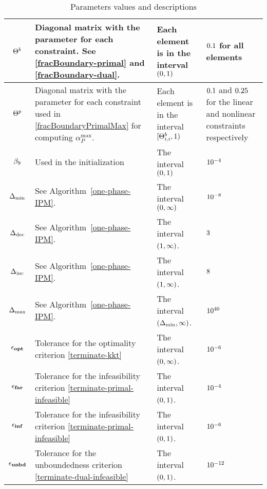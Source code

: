 \documentclass{article}
\begin{document}
\begin{table}[H]
\begin{tabular}{ |c| p{7cm}|p{4.0cm}| p{3cm}| }
\hline
 $\Theta^{b}$ & Diagonal matrix with the \fracBound{} parameter for each constraint. See \eqref{fracBoundary-primal} and \eqref{fracBoundary-dual}. & Each element is in the interval $(0,1)$ & $0.1$ for all elements \\ 
        \hline
$\Theta^{p}$ & Diagonal matrix with the \fracBound{} parameter for each constraint used in \eqref{fracBoundaryPrimalMax} for computing $\alpha_{P}^{\max}$. & Each element is in the interval $[\Theta^{b}_{i,i}, 1)$ & $0.1$ and $0.25$ for the linear and nonlinear constraints respectively \\
\hline
$\beta_{9}$  & Used in the initialization & The interval $(0,1)$ & $10^{-4}$ \\
\hline
$\Delta_{\min}$ & See Algorithm~\ref{one-phase-IPM}.  & The interval $(0,\infty)$ & $10^{-8}$ \\
\hline
$\Delta_{\text{dec}}$ & See Algorithm~\ref{one-phase-IPM}. &The interval $(1,\infty)$. & $3$ \\
\hline
$\Delta_{\text{inc}}$ & See Algorithm~\ref{one-phase-IPM}. &The interval $(1,\infty)$. & $8$ \\
\hline
$\Delta_{\max}$ & See Algorithm~\ref{one-phase-IPM}. &The interval $(\Delta_{\min},\infty)$. & $10^{40}$ \\
\hline
$\epsilon_{\textbf{opt}}$ & Tolerance for the optimality criterion \eqref{terminate-kkt} & The interval $(0,\infty)$. & $10^{-6}$  \\
\hline
$\epsilon_{\textbf{far}}$ & Tolerance for the infeasibility criterion \eqref{terminate-primal-infeasible} & The interval $(0,1)$. & $10^{-4}$ \\
\hline
$\epsilon_{\textbf{inf}}$ & Tolerance for the infeasibility criterion \eqref{terminate-primal-infeasible} & The interval $(0,1)$. & $10^{-6}$ \\
\hline
$\epsilon_{\textbf{unbd}}$ & Tolerance for the unboundedness criterion \eqref{terminate-dual-infeasible} & The interval $(0,1)$. & $10^{-12}$ \\
\hline
\end{tabular}
\caption{Parameters values and descriptions}
\end{table}

\end{document}
